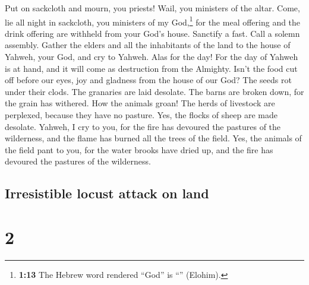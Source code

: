  Put on sackcloth and mourn, you priests! Wail, you
ministers of the altar. Come, lie all night in sackcloth, you ministers
of my God,\footnote{\textbf{1:13} The Hebrew word rendered ``God'' is
  ``'' (Elohim).} for the meal offering and the drink
offering are withheld from your God's house.  Sanctify a
fast. Call a solemn assembly. Gather the elders and all the inhabitants
of the land to the house of Yahweh, your God, and cry to Yahweh.
 Alas for the day! For the day of Yahweh is at hand, and
it will come as destruction from the Almighty.  Isn't the
food cut off before our eyes, joy and gladness from the house of our
God?  The seeds rot under their clods. The granaries are
laid desolate. The barns are broken down, for the grain has withered.
 How the animals groan! The herds of livestock are
perplexed, because they have no pasture. Yes, the flocks of sheep are
made desolate.  Yahweh, I cry to you, for the fire has
devoured the pastures of the wilderness, and the flame has burned all
the trees of the field.  Yes, the animals of the field
pant to you, for the water brooks have dried up, and the fire has
devoured the pastures of the wilderness.

\hypertarget{irresistible-locust-attack-on-land}{%
\subsection{Irresistible locust attack on
land}\label{irresistible-locust-attack-on-land}}

\hypertarget{section-1}{%
\section{2}\label{section-1}}

